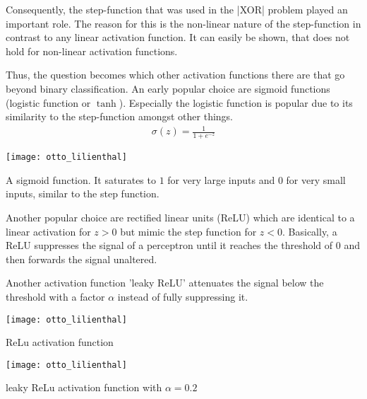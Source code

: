 Consequently, the step-function that was used in the |XOR| problem played an important role.
The reason for this is the non-linear nature of the step-function in contrast to any linear activation function.
It can easily be shown, that  does not hold for non-linear activation functions.

Thus, the question becomes which other activation functions there are that go beyond binary classification.
An early popular choice are sigmoid functions (logistic function or $\tanh$).
Especially the logistic function is popular due to its similarity to the step-function amongst other things.
\begin{align}
    \sigma(z) = \frac{1}{1 + e^{-z}}
\end{align}
\begin{marginfigure}
    \texttt{[image: otto\_lilienthal]}
    \caption[]{A sigmoid function. It saturates to $1$ for very large inputs and $0$ for very small inputs, similar to the step function.}
\end{marginfigure}

Another popular choice are rectified linear units (ReLU) which are identical to a linear activation for $z > 0$ but mimic the step function for $z < 0$.
Basically, a ReLU suppresses the signal of a perceptron until it reaches the threshold of $0$ and then forwards the signal unaltered.

Another activation function 'leaky ReLU' attenuates the signal below the threshold with a factor $\alpha$ instead of fully suppressing it.
\begin{marginfigure}
    \texttt{[image: otto\_lilienthal]}
    \caption[]{ReLu activation function}
\end{marginfigure}
\begin{marginfigure}
    \texttt{[image: otto\_lilienthal]}
    \caption[]{leaky ReLu activation function with $\alpha = 0.2$}
\end{marginfigure}


